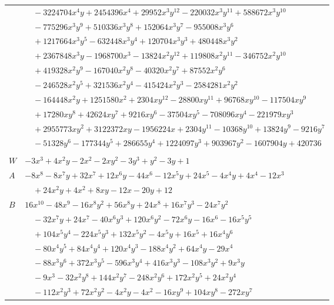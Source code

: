 \documentclass[11pt]{article}
\begin{document}
\begin{longtable}{@{}ll@{}}
 & $\quad -3224704x^{4}y+2454396x^{4}+29952x^{3}y^{12}-220032x^{3}y^{11}+588672x^{3}y^{10}$\\
 & $\quad -775296x^{3}y^{9}+510336x^{3}y^{8}+152064x^{3}y^{7}-955008x^{3}y^{6}$\\
 & $\quad +1217664x^{3}y^{5}-632448x^{3}y^{4}+120704x^{3}y^{3}+480448x^{3}y^{2}$\\
 & $\quad +2367848x^{3}y-1968700x^{3}-13824x^{2}y^{12}+119808x^{2}y^{11}-346752x^{2}y^{10}$\\
 & $\quad +419328x^{2}y^{9}-167040x^{2}y^{8}-40320x^{2}y^{7}+87552x^{2}y^{6}$\\
 & $\quad -246528x^{2}y^{5}+321536x^{2}y^{4}-415424x^{2}y^{3}-2584281x^{2}y^{2}$\\
 & $\quad -164448x^{2}y+1251580x^{2}+2304xy^{12}-28800xy^{11}+96768xy^{10}-117504xy^{9}$\\
 & $\quad +17280xy^{8}+42624xy^{7}+9216xy^{6}-37504xy^{5}-708096xy^{4}-221979xy^{3}$\\
 & $\quad +2955773xy^{2}+3122372xy-1956224x+2304y^{11}-10368y^{10}+13824y^{9}-9216y^{7}$\\
 & $\quad -51328y^{6}-177344y^{5}+286655y^{4}+1224097y^{3}+903967y^{2}-1607904y+420736$\\
\addlinespace[3pt]
\multicolumn{2}{@{}l}{$i=6$, $m=2$, neighbours $0,7,12,29,73,80,82,102$}\\
$W$ & $-3x^{3}+4x^{2}y-2x^{2}-2xy^{2}-3y^{3}+y^{2}-3y+1$\\
$A$ & $-8x^{8}-8x^{7}y+32x^{7}+12x^{6}y-44x^{6}-12x^{5}y+24x^{5}-4x^{4}y+4x^{4}-12x^{3}$\\
 & $\quad +24x^{2}y+4x^{2}+8xy-12x-20y+12$\\
$B$ & $16x^{10}-48x^{9}-16x^{8}y^{2}+56x^{8}y+24x^{8}+16x^{7}y^{3}-24x^{7}y^{2}$\\
 & $\quad -32x^{7}y+24x^{7}-40x^{6}y^{3}+120x^{6}y^{2}-72x^{6}y-16x^{6}-16x^{5}y^{5}$\\
 & $\quad +104x^{5}y^{4}-224x^{5}y^{3}+132x^{5}y^{2}-4x^{5}y+16x^{5}+16x^{4}y^{6}$\\
 & $\quad -80x^{4}y^{5}+84x^{4}y^{4}+120x^{4}y^{3}-188x^{4}y^{2}+64x^{4}y-29x^{4}$\\
 & $\quad -88x^{3}y^{6}+372x^{3}y^{5}-596x^{3}y^{4}+416x^{3}y^{3}-108x^{3}y^{2}+9x^{3}y$\\
 & $\quad -9x^{3}-32x^{2}y^{8}+144x^{2}y^{7}-248x^{2}y^{6}+172x^{2}y^{5}+24x^{2}y^{4}$\\
 & $\quad -112x^{2}y^{3}+72x^{2}y^{2}-4x^{2}y-4x^{2}-16xy^{9}+104xy^{8}-272xy^{7}$\\

\end{longtable}
\end{document}
